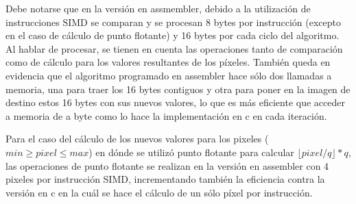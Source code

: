 Debe notarse que en la versión en assmembler, debido a la utilización de instrucciones SIMD se comparan y se procesan 8 bytes por instrucción (excepto en el caso de cálculo de punto flotante) y 16 bytes por cada ciclo del algoritmo. Al hablar de procesar, se tienen en cuenta las operaciones tanto de comparación como de cálculo para los valores resultantes de los píxeles. También queda en evidencia que el algoritmo programado en assembler hace sólo dos llamadas a memoria, una para traer los 16 bytes contiguos y otra para poner en la imagen de destino estos 16 bytes con sus nuevos valores, lo que es más eficiente que acceder a memoria de a byte como lo hace la implementación en c en cada iteración.

Para el caso del cálculo de los nuevos valores para los pixeles ($min \geq pixel \leq max$) en dónde se utilizó punto flotante para calcular $\lfloor pixel/q \rfloor * q$, las operaciones de punto flotante se realizan en la versión en assembler con 4 pixeles por instrucción SIMD, incrementando también la eficiencia contra la versión en c en la cuál se hace el cálculo de un sólo píxel por instrucción.